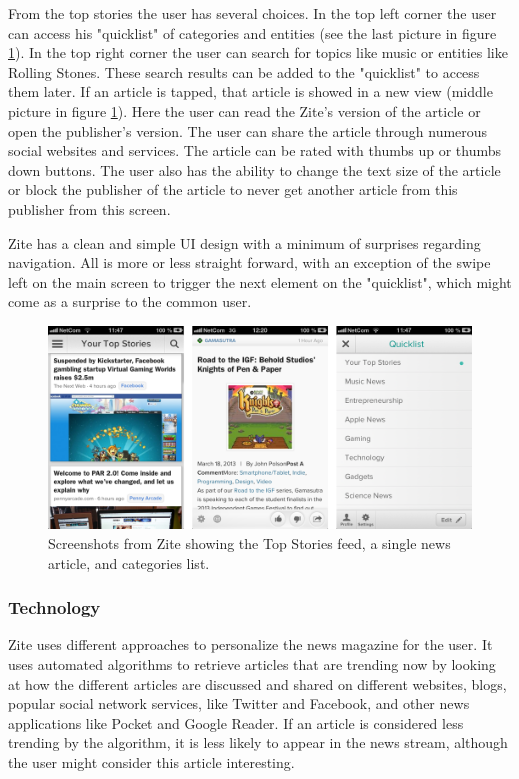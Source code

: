 From the top stories the user has several choices. In the top left corner the user can access his "quicklist" of categories and entities (see the last picture in figure \ref{screenshots_zite}). In the top right corner the user can search for topics like music or entities like Rolling Stones. These search results can be added to the "quicklist" to access them later. If an article is tapped, that article is showed in a new view (middle picture in figure \ref{screenshots_zite}). Here the user can read the Zite's version of the article or open the publisher's version. The user can share the article through numerous social websites and services. The article can be rated with thumbs up or thumbs down buttons. The user also has the ability to change the text size of the article or block the publisher of the article to never get another article from this publisher from this screen.

Zite has a clean and simple UI design with a minimum of surprises regarding navigation. All is more or less straight forward, with an exception of the swipe left on the main screen to trigger the next element on the "quicklist", which might come as a surprise to the common user.

\begin{figure}[!htbp]
\centering
\includegraphics[width=130mm]{GFX/screenshots/zite.png}
\caption{Screenshots from Zite showing the Top Stories feed, a single news article, and categories list.}
\label{screenshots_zite}
\end{figure}

\subsubsection{Technology}
Zite uses different approaches to personalize the news magazine for the user\cite{zite_faq}. It uses automated algorithms to retrieve articles that are trending now by looking at how the different articles are discussed and shared on different websites, blogs, popular social network services, like Twitter and Facebook, and other news applications like Pocket and Google Reader. If an article is considered less trending by the algorithm, it is less likely to appear in the news stream, although the user might consider this article interesting.


